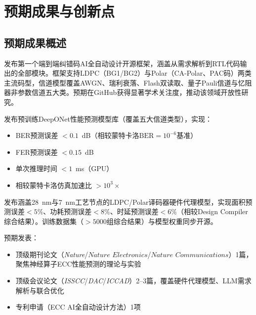 ﻿\section{预期成果与创新点}\label{sec:outcomes}

\subsection{预期成果概述}

\begin{tcolorbox}[outcomestyle,title=成果一：开源ECC AI全自动设计框架E3A]
发布第一个端到端纠错码AI全自动设计开源框架，涵盖从需求解析到RTL代码输出的全部模块。框架支持LDPC（BG1/BG2）与Polar（CA-Polar、PAC码）两类主流码型，信道模型覆盖AWGN、瑞利衰落、Flash双读取、量子Pauli信道与忆阻器非参数信道五大类。预期在GitHub获得显著学术关注度，推动该领域开放性研究。
\end{tcolorbox}

\begin{tcolorbox}[outcomestyle,title=成果二：高精度ECC性能预测神经算子模型]
发布预训练DeepONet性能预测模型库（覆盖五大信道类型），实现：
\begin{itemize}[nosep,leftmargin=1.5em]
  \item BER预测误差 $<0.1$~dB（相较蒙特卡洛$\mathrm{BER}=10^{-6}$基准）
  \item FER预测误差 $<0.15$~dB
  \item 单次推理时间 $<1$~ms（GPU）
  \item 相较蒙特卡洛仿真加速比 $>10^3\times$
\end{itemize}
\end{tcolorbox}

\begin{tcolorbox}[outcomestyle,title=成果三：跨工艺VLSI性能代理模型库]
发布涵盖28~nm与7~nm工艺节点的LDPC/Polar译码器硬件代理模型，实现面积预测误差$<5\%$、功耗预测误差$<8\%$、时延预测误差$<6\%$（相较Design Compiler综合结果）。训练数据集（$>5000$组综合结果）与模型权重同步开源。
\end{tcolorbox}

\begin{tcolorbox}[outcomestyle,title=成果四：高水平学术发表]
预期发表：
\begin{itemize}[nosep,leftmargin=1.5em]
  \item 顶级期刊论文（\textit{Nature}/$\textit{Nature Electronics}$/$\textit{Nature Communications}$）1篇，聚焦神经算子ECC性能预测的理论与实验
  \item 顶级会议论文（\textit{ISSCC}/\textit{DAC}/\textit{ICCAD}）2--3篇，覆盖硬件代理模型、LLM需求解析与联合优化
  \item 专利申请（ECC AI全自动设计方法）1项
\end{itemize}
\end{tcolorbox}

